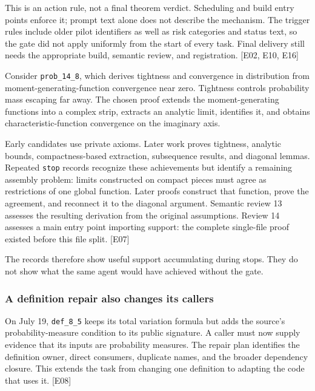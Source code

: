 This is an action rule, not a final theorem verdict. Scheduling and build entry points enforce it; prompt text alone does not describe the mechanism. The trigger rules include older pilot identifiers as well as risk categories and status text, so the gate did not apply uniformly from the start of every task. Final delivery still needs the appropriate build, semantic review, and registration. [E02, E10, E16]

Consider \nolinkurl{prob_14_8}, which derives tightness and convergence in distribution from moment-generating-function convergence near zero. Tightness controls probability mass escaping far away. The chosen proof extends the moment-generating functions into a complex strip, extracts an analytic limit, identifies it, and obtains characteristic-function convergence on the imaginary axis.

Early candidates use private axioms. Later work proves tightness, analytic bounds, compactness-based extraction, subsequence results, and diagonal lemmas. Repeated \nolinkurl{stop} records recognize these achievements but identify a remaining assembly problem: limits constructed on compact pieces must agree as restrictions of one global function. Later proofs construct that function, prove the agreement, and reconnect it to the diagonal argument. Semantic review 13 assesses the resulting derivation from the original assumptions. Review 14 assesses a main entry point importing support: the complete single-file proof existed before this file split. [E07]

The records therefore show useful support accumulating during stops. They do not show what the same agent would have achieved without the gate.

\subsubsection[A definition repair also changes its callers]{\texorpdfstring{\protect\hypertarget{l2-4}{}A definition repair also changes its callers}{A definition repair also changes its callers}}
On July 19, \nolinkurl{def_8_5} keeps its total variation formula but adds the source's probability-measure condition to its public signature. A caller must now supply evidence that its inputs are probability measures. The repair plan identifies the definition owner, direct consumers, duplicate names, and the broader dependency closure. This extends the task from changing one definition to adapting the code that uses it. [E08]

